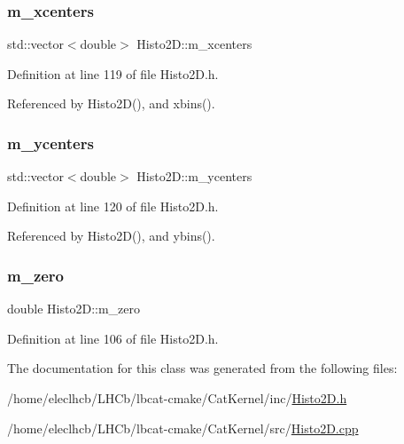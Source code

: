 \mbox{\label{classHisto2D_aa2e8211f89d086e1c0beaf3b7d18c568}} 
\subsubsection{\texorpdfstring{m\+\_\+xcenters}{m\_xcenters}}
{\footnotesize\ttfamily std\+::vector$<$double$>$ Histo2\+D\+::m\+\_\+xcenters\hspace{0.3cm}{\ttfamily [private]}}



Definition at line 119 of file Histo2\+D.\+h.



Referenced by Histo2\+D(), and xbins().

\mbox{\label{classHisto2D_a2a431c0f22a038482fc8b3913743f08b}} 
\subsubsection{\texorpdfstring{m\+\_\+ycenters}{m\_ycenters}}
{\footnotesize\ttfamily std\+::vector$<$double$>$ Histo2\+D\+::m\+\_\+ycenters\hspace{0.3cm}{\ttfamily [private]}}



Definition at line 120 of file Histo2\+D.\+h.



Referenced by Histo2\+D(), and ybins().

\mbox{\label{classHisto2D_a71dfc840fbaa159ef22091312d1ae5d9}} 
\subsubsection{\texorpdfstring{m\+\_\+zero}{m\_zero}}
{\footnotesize\ttfamily double Histo2\+D\+::m\+\_\+zero\hspace{0.3cm}{\ttfamily [private]}}



Definition at line 106 of file Histo2\+D.\+h.



The documentation for this class was generated from the following files\+:\begin{DoxyCompactItemize}
\item 
/home/eleclhcb/\+L\+H\+Cb/lbcat-\/cmake/\+Cat\+Kernel/inc/\hyperlink{Histo2D_8h}{Histo2\+D.\+h}\item 
/home/eleclhcb/\+L\+H\+Cb/lbcat-\/cmake/\+Cat\+Kernel/src/\hyperlink{Histo2D_8cpp}{Histo2\+D.\+cpp}\end{DoxyCompactItemize}
